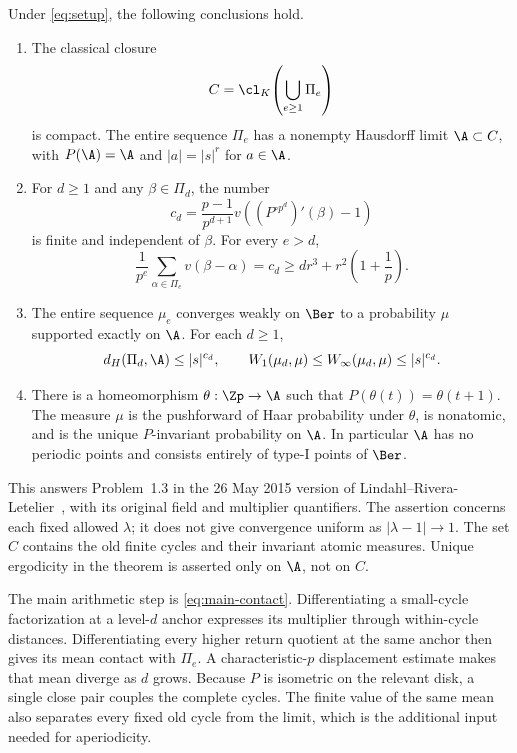 \begin{theorem}
\label{thm:compact-adding-machine}
Under \eqref{eq:setup}, the following conclusions hold.
\begin{enumerate}[label=\textup{(\roman*)},leftmargin=*]
\item The classical closure
\[
 C=\cl_K\!\left(\bigcup_{e\ge1}\Pi_e\right)
\]
is compact. The entire sequence $\Pi_e$ has a nonempty Hausdorff limit
$\A\subset C$, with $P(\A)=\A$ and $|a|=|s|^r$ for $a\in\A$.
\item For $d\ge1$ and any $\beta\in\Pi_d$, the number
\begin{equation}\label{eq:main-cd}
 c_d=\frac{p-1}{p^{d+1}}
       v\!\left((P^{\circ p^d})'(\beta)-1\right)
\end{equation}
is finite and independent of $\beta$. For every $e>d$,
\begin{equation}\label{eq:main-contact}
 \frac1{p^e}\sum_{\alpha\in\Pi_e}v(\beta-\alpha)
 =c_d\ge d r^3+r^2\left(1+\frac1p\right).
\end{equation}
\item The entire sequence $\mu_e$ converges weakly on $\Ber$ to a
probability $\mu$ supported exactly on $\A$. For each $d\ge1$,
\begin{equation}\label{eq:main-rate}
 d_H(\Pi_d,\A)\le |s|^{c_d},\qquad
 W_1(\mu_d,\mu)\le W_\infty(\mu_d,\mu)\le |s|^{c_d}.
\end{equation}
\item There is a homeomorphism $\theta:\Zp\to\A$ such that
$P(\theta(t))=\theta(t+1)$. The measure $\mu$ is the pushforward
of Haar probability under $\theta$, is nonatomic, and is the unique
$P$-invariant probability on $\A$. In particular $\A$ has no
periodic points and consists entirely of type-I points of $\Ber$.
\end{enumerate}
\end{theorem}

This answers Problem~1.3 in the 26 May 2015 version of
Lindahl--Rivera-Letelier~\cite{lindahl2016optimal}, with its original
field and multiplier quantifiers. The assertion concerns each fixed
allowed $\lambda$; it does not give convergence uniform as
$|\lambda-1|\to1$. The set $C$ contains the old finite cycles and
their invariant atomic measures. Unique ergodicity in the theorem is
asserted only on $\A$, not on $C$.

The main arithmetic step is \eqref{eq:main-contact}. Differentiating
a small-cycle factorization at a level-$d$ anchor expresses its
multiplier through within-cycle distances. Differentiating every
higher return quotient at the same anchor then gives its mean contact
with $\Pi_e$. A characteristic-$p$ displacement estimate makes that
mean diverge as $d$ grows. Because $P$ is isometric on the relevant
disk, a single close pair couples the complete cycles. The finite
value of the same mean also separates every fixed old cycle from
the limit, which is the additional input needed for aperiodicity.

